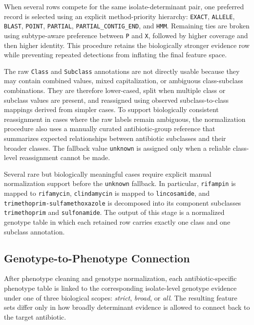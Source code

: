 When several rows compete for the same isolate-determinant pair, one preferred record is selected using an explicit method-priority hierarchy: \texttt{EXACT}, \texttt{ALLELE}, \texttt{BLAST}, \texttt{POINT}, \texttt{PARTIAL}, \texttt{PARTIAL\_CONTIG\_END}, and \texttt{HMM}. Remaining ties are broken using subtype-aware preference between \texttt{P} and \texttt{X}, followed by higher coverage and then higher identity. This procedure retains the biologically stronger evidence row while preventing repeated detections from inflating the final feature space.

The raw \texttt{Class} and \texttt{Subclass} annotations are not directly usable because they may contain combined values, mixed capitalization, or ambiguous class-subclass combinations. They are therefore lower-cased, split when multiple class or subclass values are present, and reassigned using observed subclass-to-class mappings derived from simpler cases. To support biologically consistent reassignment in cases where the raw labels remain ambiguous, the normalization procedure also uses a manually curated antibiotic-group reference that summarizes expected relationships between antibiotic subclasses and their broader classes. The fallback value \texttt{unknown} is assigned only when a reliable class-level reassignment cannot be made.

Several rare but biologically meaningful cases require explicit manual normalization support before the \texttt{unknown} fallback. In particular, \texttt{rifampin} is mapped to \texttt{rifamycin}, \texttt{clindamycin} is mapped to \texttt{lincosamide}, and \texttt{trimethoprim-sulfamethoxazole} is decomposed into its component subclasses \texttt{trimethoprim} and \texttt{sulfonamide}. The output of this stage is a normalized genotype table in which each retained row carries exactly one class and one subclass annotation.

\subsection{Genotype-to-Phenotype Connection}

After phenotype cleaning and genotype normalization, each antibiotic-specific phenotype table is linked to the corresponding isolate-level genotype evidence under one of three biological scopes: \textit{strict}, \textit{broad}, or \textit{all}. The resulting feature sets differ only in how broadly determinant evidence is allowed to connect back to the target antibiotic.

